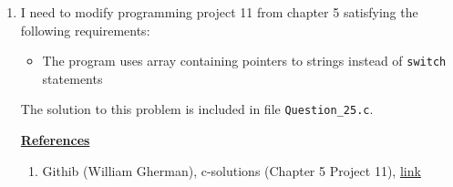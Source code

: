 \documentclass[12pt]{article}
\begin{document}
\begin{enumerate}[1.]
    \item

    I need to modify programming project 11 from chapter 5 satisfying the following requirements:

    \begin{itemize}
        \item The program uses array containing pointers to strings instead of \texttt{switch} statements
    \end{itemize}

    \bigskip

    The solution to this problem is included in file \texttt{Question\_25.c}.

    \bigskip

    \underline{\textbf{References}}

    \begin{enumerate}[1)]
        \item Githib (William Gherman), c-solutions (Chapter 5 Project 11), \href{https://github.com/williamgherman/c-solutions/blob/master/05/projects/11/11.c}{link}
    \end{enumerate}



\end{enumerate}
\end{document}
